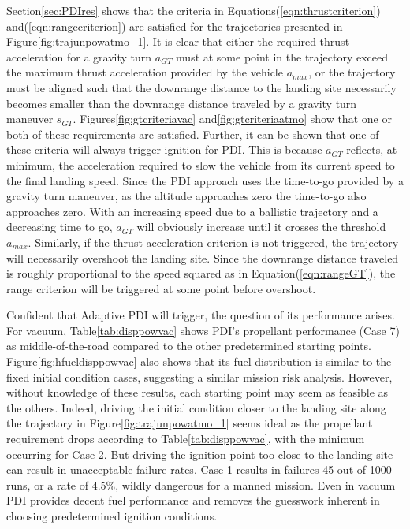 Section\:\ref{sec:PDIres} shows that the criteria in Equations\:(\ref{eqn:thrustcriterion}) and\:(\ref{eqn:rangecriterion}) are satisfied for the trajectories presented in Figure\:\ref{fig:trajunpowatmo_1}. It is clear that either the required thrust acceleration for a gravity turn $a_{GT}$ must at some point in the trajectory exceed the maximum thrust acceleration provided by the vehicle $a_{max}$, or the trajectory must be aligned such that the downrange distance to the landing site necessarily becomes smaller than the downrange distance traveled by a gravity turn maneuver $s_{GT}$. Figures\:\ref{fig:gtcriteriavac} and\:\ref{fig:gtcriteriaatmo} show that one or both of these requirements are satisfied. Further, it can be shown that one of these criteria will always trigger ignition for PDI. This is because $a_{GT}$ reflects, at minimum, the acceleration required to slow the vehicle from its current speed to the final landing speed. Since the PDI approach uses the time-to-go provided by a gravity turn maneuver, as the altitude approaches zero the time-to-go also approaches zero. With an increasing speed due to a ballistic trajectory and a decreasing time to go, $a_{GT}$ will obviously increase until it crosses the threshold $a_{max}$. Similarly, if the thrust acceleration criterion is not triggered, the trajectory will necessarily overshoot the landing site. Since the downrange distance traveled is roughly proportional to the speed squared as in Equation\:(\ref{eqn:rangeGT}), the range criterion will be triggered at some point before overshoot.

Confident that Adaptive PDI will trigger, the question of its performance arises. For vacuum, Table\:\ref{tab:disppowvac} shows PDI's propellant performance (Case 7) as middle-of-the-road compared to the other predetermined starting points. Figure\:\ref{fig:hfueldisppowvac} also shows that its fuel distribution is similar to the fixed initial condition cases, suggesting a similar mission risk analysis. However, without knowledge of these results, each starting point may seem as feasible as the others. Indeed, driving the initial condition closer to the landing site along the trajectory in Figure\:\ref{fig:trajunpowatmo_1} seems ideal as the propellant requirement drops according to Table\:\ref{tab:disppowvac}, with the minimum occurring for Case 2. But driving the ignition point too close to the landing site can result in unacceptable failure rates. Case 1 results in failures 45 out of 1000 runs, or a rate of $4.5\%$, wildly dangerous for a manned mission. Even in vacuum PDI provides decent fuel performance and removes the guesswork inherent in choosing predetermined ignition conditions.

